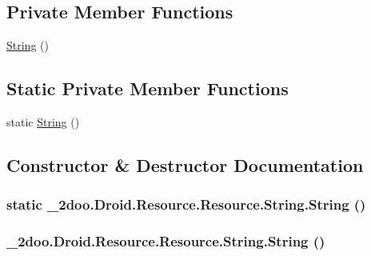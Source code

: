 \subsection*{Private Member Functions}
\begin{CompactItemize}
\item 
\hyperlink{class__2doo_1_1_droid_1_1_resource_1_1_string_7936f763e18eb55c0046c569b6a50162}{String} ()
\end{CompactItemize}
\subsection*{Static Private Member Functions}
\begin{CompactItemize}
\item 
static \hyperlink{class__2doo_1_1_droid_1_1_resource_1_1_string_8c510e67bf41a7e8cefe8dac0c6ed26a}{String} ()
\end{CompactItemize}


\subsection{Constructor \& Destructor Documentation}
\hypertarget{class__2doo_1_1_droid_1_1_resource_1_1_string_8c510e67bf41a7e8cefe8dac0c6ed26a}{
\subsubsection[{String}]{\setlength{\rightskip}{0pt plus 5cm}static \_\-2doo.Droid.Resource.Resource.String.String ()}}
\label{class__2doo_1_1_droid_1_1_resource_1_1_string_8c510e67bf41a7e8cefe8dac0c6ed26a}


\hypertarget{class__2doo_1_1_droid_1_1_resource_1_1_string_7936f763e18eb55c0046c569b6a50162}{
\subsubsection[{String}]{\setlength{\rightskip}{0pt plus 5cm}\_\-2doo.Droid.Resource.Resource.String.String ()}}
\label{class__2doo_1_1_droid_1_1_resource_1_1_string_7936f763e18eb55c0046c569b6a50162}




